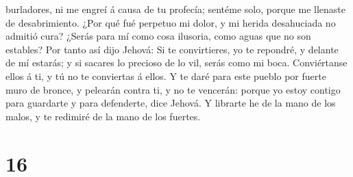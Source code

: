 burladores, ni me engreí á causa de tu profecía; sentéme solo, porque me
llenaste de desabrimiento.  ¿Por qué fué perpetuo mi dolor,
y mi herida desahuciada no admitió cura? ¿Serás para mí como cosa
ilusoria, como aguas que no son estables?  Por tanto así
dijo Jehová: Si te convirtieres, yo te repondré, y delante de mí
estarás; y si sacares lo precioso de lo vil, serás como mi boca.
Conviértanse ellos á ti, y tú no te conviertas á ellos.  Y
te daré para este pueblo por fuerte muro de bronce, y pelearán contra
ti, y no te vencerán: porque yo estoy contigo para guardarte y para
defenderte, dice Jehová.  Y librarte he de la mano de los
malos, y te redimiré de la mano de los fuertes.

\hypertarget{section-15}{%
\section{16}\label{section-15}}

